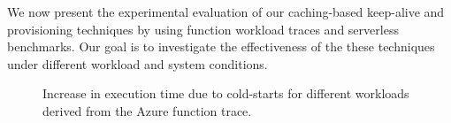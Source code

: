 \label{sec:eval}
\vspace*{-5pt}

We now present the experimental evaluation of our caching-based keep-alive and provisioning techniques by using function workload traces and serverless benchmarks.
Our goal is to investigate the effectiveness of the these techniques under different workload and system conditions. 



\begin{figure}
  \centering
    \vspace*{\myfigspace}
  \hfill 
\hfill 
  \vspace*{\myfigspace}
\caption{Increase in execution time due to cold-starts for different workloads derived from the Azure function trace.}
\label{fig:exec-overheads-all}
  \vspace*{\myfigspace}
\end{figure}


